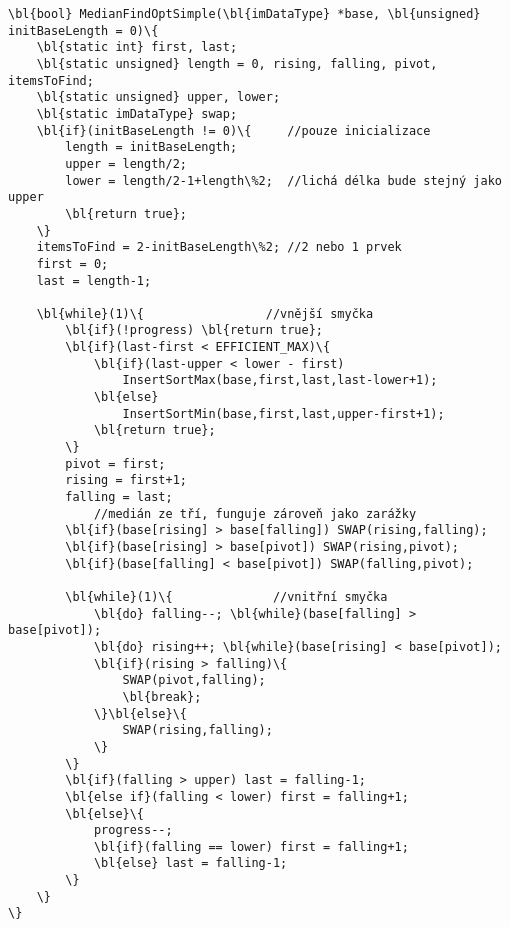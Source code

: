         \begin{Verbatim}[commandchars = \\\{\}]
\bl{bool} MedianFindOptSimple(\bl{imDataType} *base, \bl{unsigned} initBaseLength = 0)\{
    \bl{static int} first, last;
    \bl{static unsigned} length = 0, rising, falling, pivot, itemsToFind;
    \bl{static unsigned} upper, lower;
    \bl{static imDataType} swap;
    \bl{if}(initBaseLength != 0)\{     //pouze inicializace
        length = initBaseLength;
        upper = length/2;
        lower = length/2-1+length\%2;  //lichá délka bude stejný jako upper
        \bl{return true};
    \}
    itemsToFind = 2-initBaseLength\%2; //2 nebo 1 prvek
    first = 0;	
    last = length-1;

    \bl{while}(1)\{                 //vnější smyčka
        \bl{if}(!progress) \bl{return true};
        \bl{if}(last-first < EFFICIENT_MAX)\{
            \bl{if}(last-upper < lower - first)
                InsertSortMax(base,first,last,last-lower+1);	
            \bl{else}
                InsertSortMin(base,first,last,upper-first+1);	
            \bl{return true};
        \}
        pivot = first;
        rising = first+1;
        falling = last;
            //medián ze tří, funguje zároveň jako zarážky
        \bl{if}(base[rising] > base[falling]) SWAP(rising,falling);
        \bl{if}(base[rising] > base[pivot]) SWAP(rising,pivot);
        \bl{if}(base[falling] < base[pivot]) SWAP(falling,pivot);

        \bl{while}(1)\{			     //vnitřní smyčka				
            \bl{do} falling--; \bl{while}(base[falling] > base[pivot]);
            \bl{do} rising++; \bl{while}(base[rising] < base[pivot]);
            \bl{if}(rising > falling)\{	
                SWAP(pivot,falling);
                \bl{break};
            \}\bl{else}\{					
                SWAP(rising,falling);
            \}
        \}
        \bl{if}(falling > upper) last = falling-1;	
        \bl{else if}(falling < lower) first = falling+1;
        \bl{else}\{
            progress--;
            \bl{if}(falling == lower) first = falling+1;
            \bl{else} last = falling-1;
        \}
    \}
\}
        \end{Verbatim}

